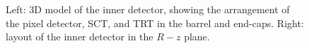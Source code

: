 \begin{figure}[htbp]
	\centering
	\hfill
	\caption{Left: 3D model of the inner detector, showing the arrangement of the pixel detector, SCT, and TRT in the barrel and end-caps. Right: layout of the inner detector in the $R-z$ plane.}
	\label{fig:ATLAS-ID}
\end{figure}

